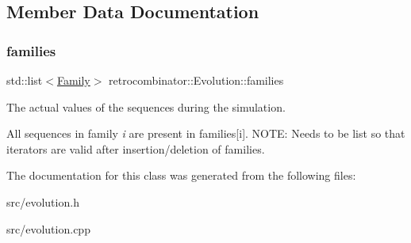 \subsection{Member Data Documentation}
\mbox{\label{classretrocombinator_1_1Evolution_a163715452c511724ecc0ef16a5030dea}} 
\subsubsection{\texorpdfstring{families}{families}}
{\footnotesize\ttfamily std\+::list$<$\hyperlink{classretrocombinator_1_1Family}{Family}$>$ retrocombinator\+::\+Evolution\+::families\hspace{0.3cm}{\ttfamily [protected]}}



The actual values of the sequences during the simulation. 

All sequences in family {\itshape i} are present in families\mbox{[}i\mbox{]}. N\+O\+TE\+: Needs to be list so that iterators are valid after insertion/deletion of families. 

The documentation for this class was generated from the following files\+:\begin{DoxyCompactItemize}
\item 
src/evolution.\+h\item 
src/evolution.\+cpp\end{DoxyCompactItemize}
